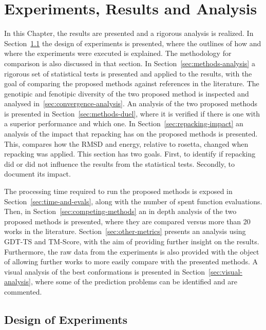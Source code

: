 \chapter{Experiments, Results and Analysis}\label{chap:experiments_and_results}

In this Chapter, the results are presented and a rigorous
analysis is realized. In Section~\ref{sec:design_of_experiments}
the design of experiments is presented, where the outlines of how
and where the experiments were executed is explained. The methodology
for comparison is also discussed in that section. In
Section~\ref{sec:methods-analysis} a rigorous set of statistical
tests is presented and applied to the results, with the goal of
comparing the proposed methods against references in the literature.
The genotipic and fenotipic diversity of the two proposed method is
inspected and analysed in~\ref{sec:convergence-analysis}.
An analysis of the two proposed methods is presented in
Section~\ref{sec:methods-duel}, where it is verified if there is one with a
superior performance and which one.
In Section~\ref{sec:repacking-impact} an analysis of the impact that
repacking has on the proposed methods is presented. This, compares how
the RMSD and energy, relative to rosetta, changed when repacking was
applied. This section has two goals. First, to identify if repacking
did or did not influence the results from the statistical tests.
Secondly, to document its impact.

The processing time required to run the proposed methods is exposed in
Section~\ref{sec:time-and-evals}, along with the number of spent function
evaluations. Then, in Section~\ref{sec:competing-methods} an in depth
analysis of the two proposed methods is presented, where they are
compared versus more than 20 works in the literature.
Section~\ref{sec:other-metrics} presents an analysis using GDT-TS
and TM-Score, with the aim of providing further insight on the results.
Furthermore, the raw data from the experiments is also provided with
the object of allowing further works to more easily compare with the
presented methods. A visual analysis of the best conformations is
presented in Section~\ref{sec:visual-analysis}, where some of the
prediction problems can be identified and are commented.

\section{Design of Experiments}\label{sec:design_of_experiments}

